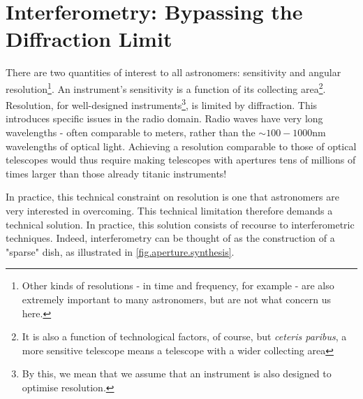 \section{Interferometry: Bypassing the Diffraction Limit}

\pg
There are two quantities of interest to all astronomers: sensitivity and angular resolution\footnote{Other kinds of resolutions - in time and frequency, for example - are also extremely important to many astronomers, but are not what concern us here.}. An instrument's sensitivity is a function of its collecting area\footnote{It is also a function of technological factors, of course, but \emph{ceteris paribus}, a more sensitive telescope means a telescope with a wider collecting area}. Resolution, for well-designed instruments\footnote{By this, we mean that we assume that an instrument is also designed to optimise resolution.}, is limited by diffraction. This introduces specific issues in the radio domain. Radio waves have very long wavelengths - often comparable to meters, rather than the $\sim100-1000$nm wavelengths of optical light. Achieving a resolution comparable to those of optical telescopes would thus require making telescopes with apertures tens of millions of times larger than those already titanic instruments!

\pg
In practice, this technical constraint on resolution is one that astronomers are very interested in overcoming. This technical limitation therefore demands a technical solution. In practice, this solution consists of recourse to interferometric techniques. Indeed, interferometry can be thought of as the construction of a "sparse" dish, as illustrated in \cref{fig.aperture.synthesis}.

